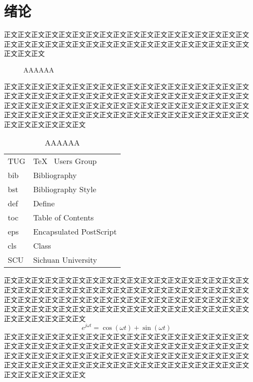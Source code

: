 \chapter{绪论}
正文正文正文正文正文正文正文正文正文正文正文正文正文正文正文正文正文正文正文正文正文正文正文正文正文正文正文正文正文正文正文正文正文正文正文正文正文正文正文\cite{ctex-doc,ctexfaq,solvethis}
\begin{figure}[ht]
	\centering
	\caption{AAAAAA}
	\label{fig_AAAAAA}
\end{figure}
正文\cite{tlc,ctexfaq}正文正文正文正文正文正文正文正文正文正文正文正文正文正文正文正文正文正文正文正文正文正文正文正文正文正文正文正文正文正文正文正文正文正文正文正文正文正文正文正文正文正文正文正文正文正文正文正文正文正文正文正文正文正文正文正文正文正文正文正文正文正文正文正文正文正文正文正文正文正文正文正文正文正文正文正文正文
\begin{table}[ht]
	\centering
	\caption{AAAAAA}
	\label{tab_1111111}
	\begin{tabular}{p{7em}p{25em}}
		TUG & \TeX~ Users Group       \\
		bib & Bibliography            \\
		bst & Bibliography Style      \\
		def & Define                  \\
		toc & Table of Contents       \\
		eps & Encapsulated PostScript \\
		cls & Class                   \\
		SCU & Sichuan University
	\end{tabular}
\end{table}
正文正文正文正文正文正文正文正文正文正文正文正文正文正文正文正文正文正文正文正文正文正文正文正文正文正文正文正文正文正文正文正文正文正文正文正文正文正文正文正文正文正文正文正文正文正文正文正文正文正文正文正文正文正文正文正文正文正文正文正文正文正文正文正文正文正文正文正文正文正文正文正文正文正文正文正文正文正文
\begin{equation}
	e^{j\omega t}=\cos(\omega t)+\sin(\omega t)
	\label{eqn_ourla}
\end{equation}
正文正文正文正文正文正文正文正文正文正文正文正文正文正文正文正文正文正文正文正文正文正文正文正文正文正文正文正文正文正文正文正文正文正文正文正文正文正文正文正文正文正文正文正文正文正文正文正文正文正文正文正文正文正文正文正文正文正文正文正文正文正文正文正文正文正文正文正文正文正文正文正文正文正文正文正文正文正文
